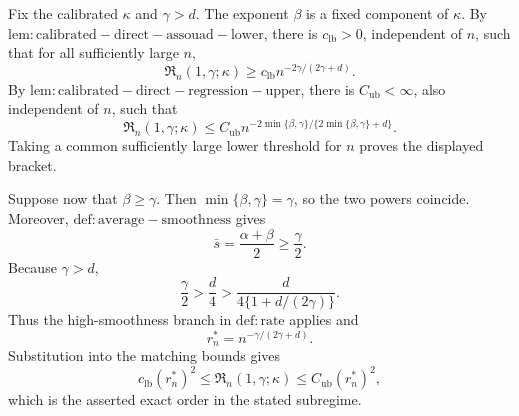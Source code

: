 Fix the calibrated \(\kappa\) and \(\gamma>d\). The exponent \(\beta\) is a fixed component of \(\kappa\). By \(\mathrm{lem:calibrated-direct-assouad-lower}\), there is \(c_{\mathrm{lb}}>0\), independent of \(n\), such that for all sufficiently large \(n\),
\[
\mathfrak R_n(1,\gamma;\kappa)
\ge c_{\mathrm{lb}}n^{-2\gamma/(2\gamma+d)}.
\]
By \(\mathrm{lem:calibrated-direct-regression-upper}\), there is \(C_{\mathrm{ub}}<\infty\), also independent of \(n\), such that
\[
\mathfrak R_n(1,\gamma;\kappa)
\le C_{\mathrm{ub}}n^{-2\min\{\beta,\gamma\}/\{2\min\{\beta,\gamma\}+d\}}.
\]
Taking a common sufficiently large lower threshold for \(n\) proves the displayed bracket.

Suppose now that \(\beta\ge\gamma\). Then \(\min\{\beta,\gamma\}=\gamma\), so the two powers coincide. Moreover, \(\mathrm{def:average-smoothness}\) gives
\[
\bar s=\frac{\alpha+\beta}{2}\ge\frac\gamma2.
\]
Because \(\gamma>d\),
\[
\frac\gamma2>\frac d4>
\frac{d}{4\{1+d/(2\gamma)\}}.
\]
Thus the high-smoothness branch in \(\mathrm{def:rate}\) applies and
\[
r_n^*=n^{-\gamma/(2\gamma+d)}.
\]
Substitution into the matching bounds gives
\[
c_{\mathrm{lb}}(r_n^*)^2
\le\mathfrak R_n(1,\gamma;\kappa)
\le C_{\mathrm{ub}}(r_n^*)^2,
\]
which is the asserted exact order in the stated subregime.